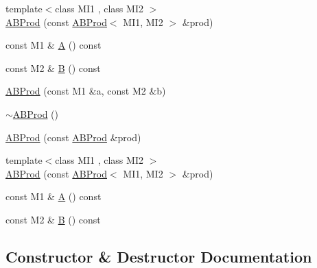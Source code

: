 \begin{DoxyCompactItemize}
{\footnotesize template$<$class M\+I1 , class M\+I2 $>$ }\\\mbox{\hyperlink{classROOT_1_1Minuit2_1_1ABProd_a792de1723360074762c646a30e7889f3}{A\+B\+Prod}} (const \mbox{\hyperlink{classROOT_1_1Minuit2_1_1ABProd}{A\+B\+Prod}}$<$ M\+I1, M\+I2 $>$ \&prod)
\item 
const M1 \& \mbox{\hyperlink{classROOT_1_1Minuit2_1_1ABProd_a14f6ecd4f0a72010d6c2a8e7f2916cfa}{A}} () const
\item 
const M2 \& \mbox{\hyperlink{classROOT_1_1Minuit2_1_1ABProd_a526658028b2971b0dbf6f1b78b05d6a7}{B}} () const
\item 
\mbox{\hyperlink{classROOT_1_1Minuit2_1_1ABProd_aee50cf5b18a146adca10f08b5475ec9b}{A\+B\+Prod}} (const M1 \&a, const M2 \&b)
\item 
\mbox{\hyperlink{classROOT_1_1Minuit2_1_1ABProd_acf17bb5e9c597f836bf033c8a56c1195}{$\sim$\+A\+B\+Prod}} ()
\item 
\mbox{\hyperlink{classROOT_1_1Minuit2_1_1ABProd_a7e68f6f5154087b32415717962556992}{A\+B\+Prod}} (const \mbox{\hyperlink{classROOT_1_1Minuit2_1_1ABProd}{A\+B\+Prod}} \&prod)
\item 
{\footnotesize template$<$class M\+I1 , class M\+I2 $>$ }\\\mbox{\hyperlink{classROOT_1_1Minuit2_1_1ABProd_a792de1723360074762c646a30e7889f3}{A\+B\+Prod}} (const \mbox{\hyperlink{classROOT_1_1Minuit2_1_1ABProd}{A\+B\+Prod}}$<$ M\+I1, M\+I2 $>$ \&prod)
\item 
const M1 \& \mbox{\hyperlink{classROOT_1_1Minuit2_1_1ABProd_a14f6ecd4f0a72010d6c2a8e7f2916cfa}{A}} () const
\item 
const M2 \& \mbox{\hyperlink{classROOT_1_1Minuit2_1_1ABProd_a526658028b2971b0dbf6f1b78b05d6a7}{B}} () const
\end{DoxyCompactItemize}


\subsection{Constructor \& Destructor Documentation}
\mbox{\label{classROOT_1_1Minuit2_1_1ABProd_aee50cf5b18a146adca10f08b5475ec9b}} 
